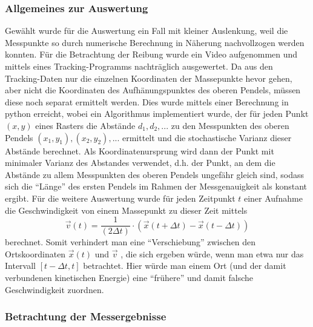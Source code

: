\subsubsection{Allgemeines zur Auswertung}
Gewählt wurde für die Auswertung ein Fall mit kleiner Auslenkung, weil die Messpunkte so durch numerische Berechnung in Näherung nachvollzogen werden konnten.
Für die Betrachtung der Reibung wurde ein Video aufgenommen und mittels eines Tracking-Programms nachträglich ausgewertet. 
Da aus den Tracking-Daten nur die einzelnen Koordinaten der Massepunkte hevor gehen, aber nicht die Koordinaten des Aufhänungspunktes des oberen Pendels, müssen diese noch separat ermittelt werden. Dies wurde mittels einer Berechnung in python erreicht, wobei ein Algorithmus implementiert wurde, der für jeden Punkt $(x, y)$ eines Rasters die Abstände $d_1, d_2, ... $ zu den Messpunkten des oberen Pendels $(x_1, y_1), (x_2, y_2), ...$ ermittelt und die stochastische Varianz dieser Abstände berechnet. Als Koordinatenursprung wird dann der Punkt mit minimaler Varianz des Abstandes verwendet, d.h. der Punkt, an dem die Abstände zu allem Messpunkten des oberen Pendels ungefähr gleich sind, sodass sich die \enquote{Länge} des ersten Pendels im Rahmen der Messgenauigkeit als konstant ergibt.  
Für die weitere Auswertung wurde für jeden Zeitpunkt $ t $ einer Aufnahme die Geschwindigkeit von einem Massepunkt zu dieser Zeit mittels
\begin{equation}
\vec{v}(t) = \frac{1}{(2 \Delta t)} \cdot (\vec{x}(t+\Delta t) - \vec{x}(t-\Delta t))
\end{equation} 
berechnet. 
Somit verhindert man eine \enquote{Verschiebung} zwischen den Ortskoordinaten $  \vec{x} (t) $ und $ \vec{v} $ , die sich ergeben würde, wenn man etwa nur das Intervall $ [t - \Delta t, t] $ betrachtet. Hier würde man einem Ort (und der damit verbundenen kinetischen Energie) eine \enquote{frühere} und damit falsche Geschwindigkeit zuordnen. 
\subsubsection{Betrachtung der Messergebnisse}


